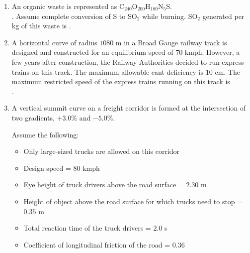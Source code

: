 \documentclass[journal,12pt,onecolumn]{article}
\theoremstyle{remark}
\begin{document}
\begin{enumerate}
    \item An organic waste is represented as C$_{240}$O$_{200}$H$_{180}$N$_5$S.\\
    .
    Assume complete conversion of S to SO$_2$ while burning.
    SO$_2$ generated  per kg of this waste is \underline{\hspace{2cm}}
    .
    
    \hfill{}
    
    \item A horizontal curve of radius $1080$ m  in a Broad
    Gauge railway track is designed and constructed for an equilibrium speed of
    $70$ kmph. However, a few years after construction, the Railway Authorities decided
    to run express trains on this track. The maximum allowable cant deficiency is
    $10$ cm.
    The maximum restricted speed  of the express trains running on this track
    is \underline{\hspace{2cm}} \\ .
    
    \hfill{}
    
    \item A vertical summit curve on a freight corridor is formed at the intersection of two
    gradients, $+3.0\%$ and $-5.0\%$.
    
    Assume the following:
    \begin{itemize}
    \item Only large-sized trucks are allowed on this corridor
    
    \item Design speed = $80$ kmph
    
    \item Eye height of truck drivers above the road surface = $2.30$ m
    
    \item Height of object above the road surface for which trucks need to stop = $0.35$ m
    
    \item Total reaction time of the truck drivers = $2.0$ s
    
    \item Coefficient of longitudinal friction of the road = $0.36$
    

\end{itemize}
\end{enumerate}
\end{document}

